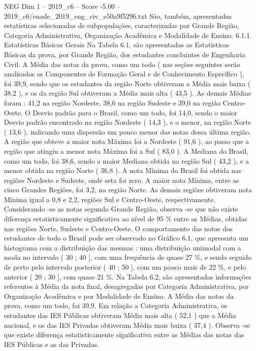 \begin{textsample}{NEG Dim 1 – 2019\_c6 – Score -5.00 – 2019\_c6/enade\_2019\_eng\_civ\_e50a9f5296.txt}
São, também, apresentadas estatísticas selecionadas de subpopulações, caracterizadas por Grande Região, Categoria Administrativa, Organização Acadêmica e Modalidade de Ensino. 6.1.1 Estatísticas Básicas Gerais Na Tabela 6.1, são apresentadas as Estatísticas Básicas da prova, por Grande Região, dos estudantes concluintes de Engenharia Civil.
A Média das notas da prova, como um todo ( nas seções seguintes serão analisados os Componentes de Formação Geral e de Conhecimento Específico ), foi 39,9, sendo que os estudantes da região Norte obtiveram a Média mais baixa ( 38,2 ), e os da região Sul obtiveram a Média mais alta ( 43,5 ).
As demais Médias foram : 41,2 na região Nordeste, 38,6 na região Sudeste e 39,0 na região Centro-Oeste.
O Desvio padrão para o Brasil, como um todo, foi 14,0, sendo o maior Desvio padrão encontrado na região Nordeste ( 14,3 ), e o menor, na região Norte ( 13,6 ), indicando uma dispersão um pouco menor das notas dessa última região.
A região que obteve a maior nota Máxima foi a Nordeste ( 91,6 ), ao passo que a região que atingiu a menor nota Máxima foi a Sul ( 83,0 ).
A Mediana do Brasil, como um todo, foi 38,6, sendo a maior Mediana obtida na região Sul ( 43,2 ), e a menor obtida na região Norte ( 36,8 ).
A nota Mínima do Brasil foi obtida nas regiões Nordeste e Sudeste, onde esta foi zero.
A maior nota Mínima, entre as cinco Grandes Regiões, foi 3,2, na região Norte.
As demais regiões obtiveram nota Mínima igual a 0,8 e 2,2, regiões Sul e Centro-Oeste, respectivamente.
Considerando -se as notas segundo Grande Região, observa -se que não existe diferença estatisticamente significativa ao nível de 95 \% entre as Médias, obtidas nas regiões Norte, Sudeste e Centro-Oeste.
O comportamento das notas dos estudantes de todo o Brasil pode ser observado no Gráfico 6.1, que apresenta um histograma com a distribuição das mesmas : uma distribuição unimodal com a moda no intervalo ( 30 ; 40 ], com uma frequência de quase 27 \%, e sendo seguido de perto pelo intervalo posterior ( 40 ; 50 ], com um pouco mais de 22 \%, e pelo anterior ( 20 ; 30 ], com quase 21 \%.
Na Tabela 6.2, são apresentadas informações referentes à Média da nota final, desagregadas por Categoria Administrativa, por Organização Acadêmica e por Modalidade de Ensino.
A Média das notas da prova, como um todo, foi 39,9.
Em relação a Categoria Administrativa, os estudantes das IES Públicas obtiveram Média mais alta ( 52,1 ) que a Média nacional, e os das IES Privadas obtiveram Média mais baixa ( 37,4 ).
Observa -se que existe diferença estatisticamente significativa entre as Médias das notas das IES Públicas e as das Privadas.

\end{textsample}
